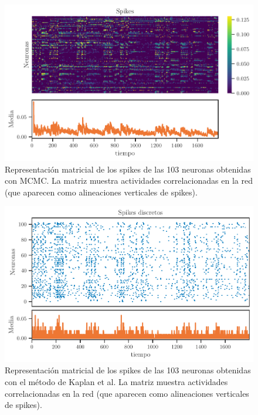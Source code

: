 \begin{figure}[h!]
	\centering{}\includegraphics[width=\imsize]{MCMC_spike.pdf}
	\caption[Representación  matricial de los spikes de las 103 neuronas obtenidas con MCMC. ]{Representación  matricial de los spikes de las 103 neuronas obtenidas con MCMC. La matriz muestra  actividades correlacionadas en la red (que aparecen como alineaciones verticales de spikes).}\label{f:MCMC_spike}  
\end{figure}


\begin{figure}[h!]
	\centering{}\includegraphics[width=\imsize]{kaplan_raster.pdf}
	\caption[Representación  matricial de los spikes de las 103 neuronas obtenidas con el método de Kaplan et al. ]{Representación  matricial de los spikes de las 103 neuronas obtenidas con el método de Kaplan et al. La matriz muestra  actividades correlacionadas en la red (que aparecen como alineaciones verticales de spikes).}\label{f:kaplan_raster}  
\end{figure}

